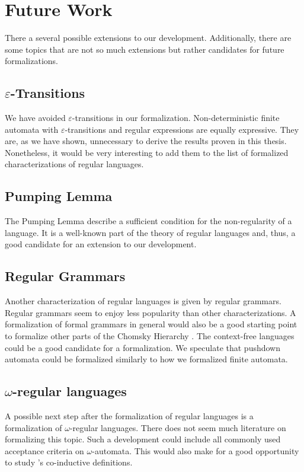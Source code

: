 

\section{Future Work}
There a several possible extensions to our development.
Additionally, there are some topics that are not so much extensions but rather candidates for future formalizations.

\subsection{$\varepsilon$-Transitions}
We have avoided $\varepsilon$-transitions in our formalization. 
Non-deterministic finite automata with $\varepsilon$-transitions and regular expressions are equally expressive.
They are, as we have shown, unnecessary to derive the results proven in this thesis.
Nonetheless, it would be very interesting to add them to the list of formalized characterizations of regular languages.

\subsection{Pumping Lemma}
The Pumping Lemma \cite{BarHillelPerlesShamir61Formal} describe a sufficient condition for the non-regularity of a language. 
It is a well-known part of the theory of regular languages and, thus, a good candidate for an extension to our development.

\subsection{Regular Grammars}
Another characterization of regular languages is given by regular grammars.
Regular grammars seem to enjoy less popularity than other characterizations.
A formalization of formal grammars in general would also be a good starting point to formalize other parts of the
Chomsky Hierarchy \cite{Chomsky1956}. 
The context-free languages could be a good candidate for a formalization.
We speculate that pushdown automata could be formalized similarly to how we formalized finite automata.

\subsection{$\omega$-regular languages}
A possible next step after the formalization of regular languages is a formalization of $\omega$-regular languages.
There does not seem much literature on formalizing this topic.
Such a development could include all commonly used acceptance criteria on $\omega$-automata.
This would also make for a good opportunity to study \coq's co-inductive definitions. 
